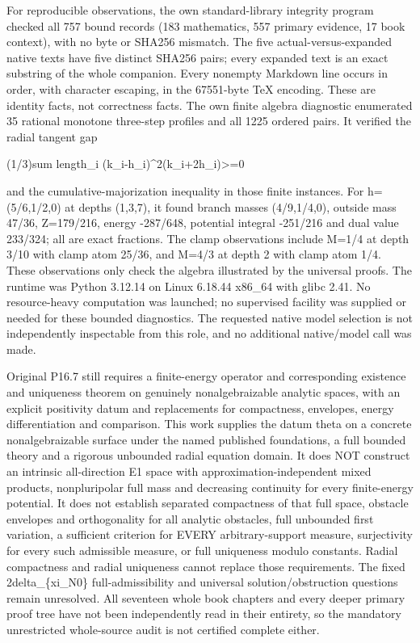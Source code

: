 \documentclass[11pt]{article}
\begin{document}
For reproducible observations, the own standard-library integrity program checked all 757 bound records (183 mathematics, 557 primary evidence, 17 book context), with no byte or SHA256 mismatch. The five actual-versus-expanded native texts have five distinct SHA256 pairs; every expanded text is an exact substring of the whole companion. Every nonempty Markdown line occurs in order, with character escaping, in the 67551-byte TeX encoding. These are identity facts, not correctness facts. The own finite algebra diagnostic enumerated 35 rational monotone three-step profiles and all 1225 ordered pairs. It verified the radial tangent gap

(1/3)sum length\_i (k\_i-h\_i)\textasciicircum{}2(k\_i+2h\_i)>=0

and the cumulative-majorization inequality in those finite instances. For h=(5/6,1/2,0) at depths (1,3,7), it found branch masses (4/9,1/4,0), outside mass 47/36, Z=179/216, energy -287/648, potential integral -251/216 and dual value 233/324; all are exact fractions. The clamp observations include M=1/4 at depth 3/10 with clamp atom 25/36, and M=4/3 at depth 2 with clamp atom 1/4. These observations only check the algebra illustrated by the universal proofs. The runtime was Python 3.12.14 on Linux 6.18.44 x86\_64 with glibc 2.41. No resource-heavy computation was launched; no supervised facility was supplied or needed for these bounded diagnostics. The requested native model selection is not independently inspectable from this role, and no additional native/model call was made.

Original P16.7 still requires a finite-energy operator and corresponding existence and uniqueness theorem on genuinely nonalgebraizable analytic spaces, with an explicit positivity datum and replacements for compactness, envelopes, energy differentiation and comparison. This work supplies the datum theta on a concrete nonalgebraizable surface under the named published foundations, a full bounded theory and a rigorous unbounded radial equation domain. It does NOT construct an intrinsic all-direction E1 space with approximation-independent mixed products, nonpluripolar full mass and decreasing continuity for every finite-energy potential. It does not establish separated compactness of that full space, obstacle envelopes and orthogonality for all analytic obstacles, full unbounded first variation, a sufficient criterion for EVERY arbitrary-support measure, surjectivity for every such admissible measure, or full uniqueness modulo constants. Radial compactness and radial uniqueness cannot replace those requirements. The fixed 2delta\_\{xi\_N0\} full-admissibility and universal solution/obstruction questions remain unresolved. All seventeen whole book chapters and every deeper primary proof tree have not been independently read in their entirety, so the mandatory unrestricted whole-source audit is not certified complete either.
\end{document}
